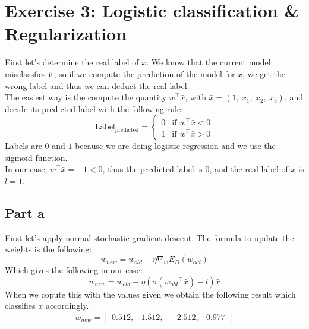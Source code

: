 \documentclass[a4paper, 10pt]{article}
\begin{document}
\section{Exercise 3: Logistic classification \& Regularization}
First let's determine the real label of $x$. We know that the current model misclassfies it,
so if we compute the prediction of the model for $x$, we get the wrong label and thus we can 
deduct the real label.
\\
The easiest way is the compute the quantity $w^\top \bar{x}$, with $\bar{x} = (1,\ x_1,\ x_2,\ x_3)$, and decide its predicted label with the following rule:
$$
\text{Label}_\text{predicted} = \left\{ \begin{array}{ll}  
                                    0 & \text{if $w^\top \bar{x} < 0$}
                                    \\ 
                                    1 & \text{if $w^\top \bar{x} > 0$}
                                        \end{array}
                                \right.
$$
Labels are $0$ and $1$ because we are doing logistic regression and we use the sigmoïd function.
\\
In our case, $w^\top \bar{x} = -1 <0$, thus the predicted label is $0$, and the real label of $x$ is $l=1$.
\subsection{Part a}
First let's apply normal stochastic gradient descent. The formula to update the weights is the following:
$$
w_{new} = w_{old} - \eta \nabla_w E_D(w_{old})
$$
Which gives the following in our case:
$$
w_{new} = w_{old} - \eta (\sigma({w_{old}}^\top \bar{x}) - l) \bar{x}
$$
When we copute this with the values given we obtain the following result which
classifies $x$ accordingly.
$$
w_{new} = \begin{bmatrix}
    0.512, & 1.512, & -2.512, & 0.977
\end{bmatrix}
$$
\end{document}
